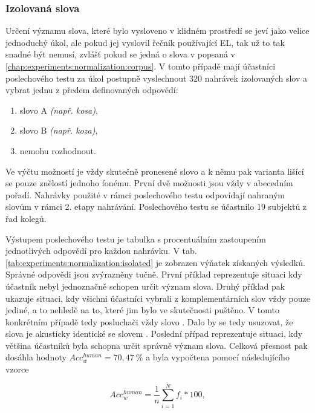 \subsubsection{Izolovaná slova}

Určení významu slova, které bylo vysloveno v klidném prostředí se jeví jako velice jednoduchý úkol, ale pokud jej vyslovil řečník používající EL, tak už to tak snadné být nemusí, zvlášť pokud se jedná o slova v popsaná v \ref{chap:experiments:normalization:corpus}. V tomto případě mají účastníci poslechového testu za úkol postupně vyslechnout $320$ nahrávek izolovaných slov a vybrat jednu z předem definovaných odpovědí:

\begin{enumerate}[label=\alph*)]
  \item slovo A \textit{(např. kosa)},
  \item slovo B \textit{(např. koza)},
  \item nemohu rozhodnout.
\end{enumerate}

\noindent Ve výčtu možností je vždy skutečně pronesené slovo a k němu pak varianta lišící se pouze znělostí jednoho fonému. První dvě možnosti jsou vždy v abecedním pořadí. Nahrávky použité v rámci poslechového testu odpovídají nahraným slovům v rámci 2. etapy nahrávání. Poslechového testu se účastnilo $19$ subjektů z řad kolegů.

Výstupem poslechového testu je tabulka s procentuálním zastoupením jednotlivých odpovědí pro každou nahrávku. V tab. \ref{tab:experiments:normalization:isolated} je zobrazen výňatek získaných výsledků. Správné odpovědi jsou zvýrazněny tučně. První příklad reprezentuje situaci kdy účastník nebyl jednoznačně schopen určit význam slova. Druhý příklad pak ukazuje situaci, kdy všichni účastníci vybrali z komplementárních slov vždy pouze jediné, a to nehledě na to, které jim bylo ve skutečnosti puštěno. V tomto konkrétním případě tedy posluchači vždy  slovo . Dalo by se tedy usuzovat, že slova  je akusticky identické se slovem . Poslední případ reprezentuje situaci, kdy většina účastníků byla schopna určit správně význam slova. Celková přesnost pak dosáhla hodnoty $Acc_w^{human} = 70,47\ \%$ a byla vypočtena pomocí následujícího vzorce

\begin{equation}
  Acc_w^{human} = \frac{1}{n} \sum_{i=1}^{N} f_i * 100,
  \label{eq:experiments:normalization:accuracy:human}
\end{equation}

